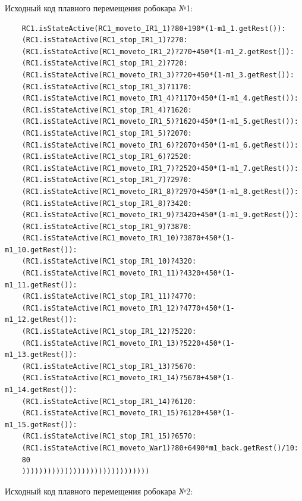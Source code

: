 Исходный код плавного перемещения робокара №1:

\begin{verbatim}
    RC1.isStateActive(RC1_moveto_IR1_1)?80+190*(1-m1_1.getRest()):
    (RC1.isStateActive(RC1_stop_IR1_1)?270:
    (RC1.isStateActive(RC1_moveto_IR1_2)?270+450*(1-m1_2.getRest()):
    (RC1.isStateActive(RC1_stop_IR1_2)?720:
    (RC1.isStateActive(RC1_moveto_IR1_3)?720+450*(1-m1_3.getRest()):
    (RC1.isStateActive(RC1_stop_IR1_3)?1170:
    (RC1.isStateActive(RC1_moveto_IR1_4)?1170+450*(1-m1_4.getRest()):
    (RC1.isStateActive(RC1_stop_IR1_4)?1620:
    (RC1.isStateActive(RC1_moveto_IR1_5)?1620+450*(1-m1_5.getRest()):
    (RC1.isStateActive(RC1_stop_IR1_5)?2070:
    (RC1.isStateActive(RC1_moveto_IR1_6)?2070+450*(1-m1_6.getRest()):
    (RC1.isStateActive(RC1_stop_IR1_6)?2520:
    (RC1.isStateActive(RC1_moveto_IR1_7)?2520+450*(1-m1_7.getRest()):
    (RC1.isStateActive(RC1_stop_IR1_7)?2970:
    (RC1.isStateActive(RC1_moveto_IR1_8)?2970+450*(1-m1_8.getRest()):
    (RC1.isStateActive(RC1_stop_IR1_8)?3420:
    (RC1.isStateActive(RC1_moveto_IR1_9)?3420+450*(1-m1_9.getRest()):
    (RC1.isStateActive(RC1_stop_IR1_9)?3870:
    (RC1.isStateActive(RC1_moveto_IR1_10)?3870+450*(1-m1_10.getRest()):
    (RC1.isStateActive(RC1_stop_IR1_10)?4320:
    (RC1.isStateActive(RC1_moveto_IR1_11)?4320+450*(1-m1_11.getRest()):
    (RC1.isStateActive(RC1_stop_IR1_11)?4770:
    (RC1.isStateActive(RC1_moveto_IR1_12)?4770+450*(1-m1_12.getRest()):
    (RC1.isStateActive(RC1_stop_IR1_12)?5220:
    (RC1.isStateActive(RC1_moveto_IR1_13)?5220+450*(1-m1_13.getRest()):
    (RC1.isStateActive(RC1_stop_IR1_13)?5670:
    (RC1.isStateActive(RC1_moveto_IR1_14)?5670+450*(1-m1_14.getRest()):
    (RC1.isStateActive(RC1_stop_IR1_14)?6120:
    (RC1.isStateActive(RC1_moveto_IR1_15)?6120+450*(1-m1_15.getRest()):
    (RC1.isStateActive(RC1_stop_IR1_15)?6570:
    (RC1.isStateActive(RC1_moveto_War1)?80+6490*m1_back.getRest()/10:
    80
    ))))))))))))))))))))))))))))))
\end{verbatim}

Исходный код плавного перемещения робокара №2:

